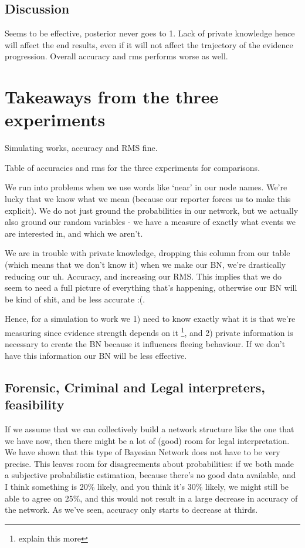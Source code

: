 \subsection{Discussion}

Seems to be effective, posterior never goes to 1. Lack of private knowledge hence will affect the end results, even if it will not affect the trajectory of the evidence progression. Overall accuracy and rms performs worse as well.


\section{Takeaways from the three experiments}



Simulating works, accuracy and RMS fine.

Table of accuracies and rms for the three experiments for comparisons.

We run into problems when we use words like `near' in our node names. We're lucky that we know what we mean (because our reporter forces us to make this explicit). We do not just ground the probabilities in our network, but we actually also ground our random variables - we have a measure of exactly what events we are interested in, and which we aren't.

We are in trouble with private knowledge, dropping this column from our table (which means that we don't know it) when we make our BN, we're drastically reducing our uh. Accuracy, and increasing our RMS. This implies that we do seem to need a full picture of everything that's happening, otherwise our BN will be kind of shit, and be less accurate :(.

Hence, for a simulation to work we 1) need to know exactly what it is that we're measuring since evidence strength depends on it \footnote{explain this more}, and 2) private information is necessary to create the BN because it influences fleeing behaviour. If we don't have this information our BN will be less effective.

\subsection{Forensic, Criminal and Legal interpreters, feasibility}
If we assume that we can collectively build a network structure like the one that we have now, then there might be a lot of (good) room for legal interpretation. We have shown that this type of Bayesian Network does not have to be very precise. This leaves room for disagreements about probabilities: if we both made a subjective probabilistic estimation, because there's no good data available, and I think something is 20\% likely, and you think it's 30\% likely, we might still be able to agree on 25\%, and this would not result in a large decrease in accuracy of the network. As we've seen, accuracy only starts to decrease at thirds.

